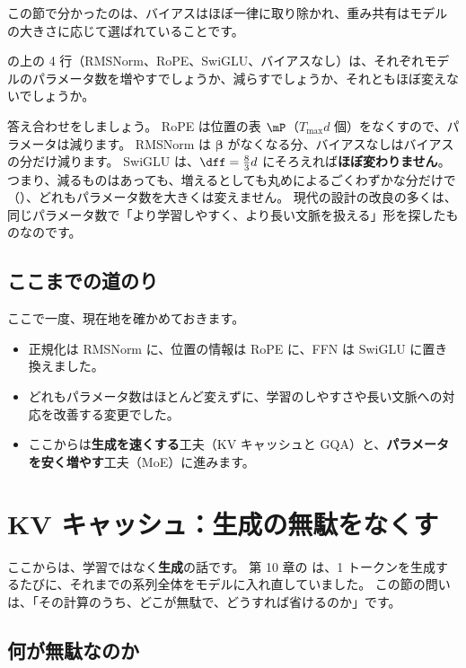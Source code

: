 この節で分かったのは、バイアスはほぼ一律に取り除かれ、重み共有はモデルの大きさに応じて選ばれていることです。

\begin{quiz}
の上の 4 行（RMSNorm、RoPE、SwiGLU、バイアスなし）は、それぞれモデルのパラメータ数を増やすでしょうか、減らすでしょうか、それともほぼ変えないでしょうか。
\end{quiz}

答え合わせをしましょう。
RoPE は位置の表 $\mP$（$T_{\max}d$ 個）をなくすので、パラメータは減ります。
RMSNorm は $\bm\beta$ がなくなる分、バイアスなしはバイアスの分だけ減ります。
SwiGLU は、$\dff=\tfrac83 d$ にそろえれば\textbf{ほぼ変わりません}。
つまり、減るものはあっても、増えるとしても丸めによるごくわずかな分だけで（）、どれもパラメータ数を大きくは変えません。
現代の設計の改良の多くは、同じパラメータ数で「より学習しやすく、より長い文脈を扱える」形を探したものなのです。

\subsection*{ここまでの道のり}

ここで一度、現在地を確かめておきます。
\begin{itemize}
\item 正規化は RMSNorm に、位置の情報は RoPE に、FFN は SwiGLU に置き換えました。
\item どれもパラメータ数はほとんど変えずに、学習のしやすさや長い文脈への対応を改善する変更でした。
\item ここからは\textbf{生成を速くする}工夫（KV キャッシュと GQA）と、\textbf{パラメータを安く増やす}工夫（MoE）に進みます。
\end{itemize}

\section{KV キャッシュ：生成の無駄をなくす}\label{sec:ma-kvcache}

ここからは、学習ではなく\textbf{生成}の話です。
第 10 章の  は、1 トークンを生成するたびに、それまでの系列全体をモデルに入れ直していました。
この節の問いは、「その計算のうち、どこが無駄で、どうすれば省けるのか」です。

\subsection*{何が無駄なのか}

